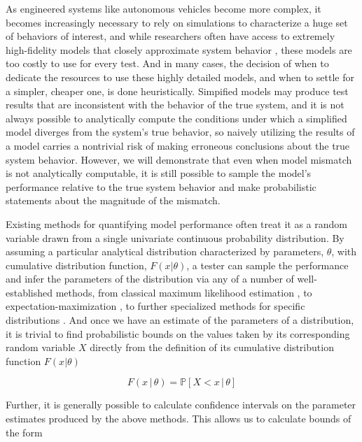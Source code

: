 \documentclass{amsart}
\begin{document}
As engineered systems like autonomous vehicles become more complex, it becomes increasingly necessary to rely on simulations to characterize a huge set of behaviors of interest, and while researchers often have access to extremely high-fidelity models that closely approximate system behavior \cite{mcruer75, pearce62}, these models are too costly to use for every test. And in many cases, the decision of when to dedicate the resources to use these highly detailed models, and when to settle for a simpler, cheaper one, is done heuristically. Simpified models may produce test results that are inconsistent with the behavior of the true system, and it is not always possible to analytically compute the conditions under which a simplified model diverges from the system's true behavior, so naively utilizing the results of a model carries a nontrivial risk of making erroneous conclusions about the true system behavior. However, we will demonstrate that even when model mismatch is not analytically computable, it is still possible to sample the model's performance relative to the true system behavior and make probabilistic statements about the magnitude of the mismatch.
\newline

Existing methods for quantifying model performance often treat it as a random variable drawn from a single univariate continuous probability distribution. By assuming a particular analytical distribution characterized by parameters, $\theta$, with cumulative distribution function, $F(x|\theta)$, a tester can sample the performance and infer the parameters of the distribution via any of a number of well-established methods, from classical maximum likelihood estimation \cite{gelman13}, to expectation-maximization \cite{dempster77}, to further specialized methods for specific distributions \cite{tang19,ren22}. And once we have an estimate of the parameters of a distribution, it is trivial to find probabilistic bounds on the values taken by its corresponding random variable $X$ directly from the definition of its cumulative distribution function $F(x|\theta)$

\begin{equation}
    F(x\,|\,\theta) = \mathbb{P}[X<x\,|\,\theta] \nonumber
\end{equation}

Further, it is generally possible to calculate confidence intervals on the parameter estimates produced by the above methods. This allows us to calculate bounds of the form
\end{document}
